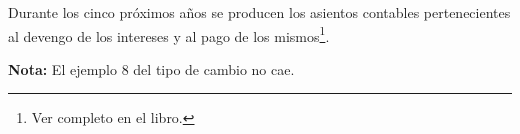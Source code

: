 Durante los cinco próximos años se producen los asientos contables pertenecientes al devengo de los intereses y al pago de los mismos\footnote{Ver completo en el libro.}.

\begin{tcolorbox}[colback=blue!5!white,colframe=blue!75!black]
    \textbf{Nota:} El ejemplo 8 del tipo de cambio no cae.
    
\end{tcolorbox}















